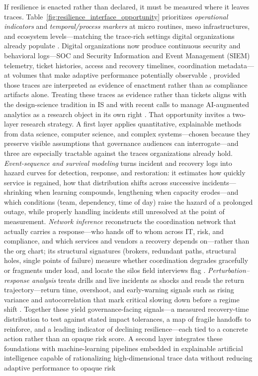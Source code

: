 If resilience is enacted rather than declared, it must be measured where it leaves traces. Table~\ref{fig:resilience_interface_opportunity} prioritizes \emph{operational indicators} and \emph{temporal/process markers} at micro routines, meso infrastructures, and ecosystem levels---matching the trace-rich settings digital organizations already populate \autocite{bruneau2003framework,francis2014metric,kuypers2018designing}. Digital organizations now produce continuous security and behavioral logs---SOC and Security Information and Event Management (SIEM) telemetry, ticket histories, access and recovery timelines, coordination metadata---at volumes that make adaptive performance potentially observable \autocite{howison2011validity,miloslavskaya2016security,kuypers2018designing}, provided those traces are interpreted as evidence of enactment rather than as compliance artifacts alone. Treating these traces as evidence rather than tickets aligns with the design-science tradition in IS \autocite{hevner2004design,gregor2013positioning,baskerville2015genres} and with recent calls to manage AI-augmented analytics as a research object in its own right \autocite{berente2021managing}. That opportunity invites a two-layer research strategy. A first layer applies quantitative, explainable methods from data science, computer science, and complex systems---chosen because they preserve visible assumptions that governance audiences can interrogate---and three are especially tractable against the traces organizations already hold. \emph{Event-sequence and survival modeling} turns incident and recovery logs into hazard curves for detection, response, and restoration: it estimates how quickly service is regained, how that distribution shifts across successive incidents---shrinking when learning compounds, lengthening when capacity erodes---and which conditions (team, dependency, time of day) raise the hazard of a prolonged outage, while properly handling incidents still unresolved at the point of measurement. \emph{Network inference} reconstructs the coordination network that actually carries a response---who hands off to whom across IT, risk, and compliance, and which services and vendors a recovery depends on---rather than the org chart; its structural signatures (brokers, redundant paths, structural holes, single points of failure) measure whether coordination degrades gracefully or fragments under load, and locate the silos field interviews flag \autocite{gao2016universal}. \emph{Perturbation--response analysis} treats drills and live incidents as shocks and reads the return trajectory---return time, overshoot, and early-warning signals such as rising variance and autocorrelation that mark critical slowing down before a regime shift \autocite{dawson2011agentbased,krakovska2023resilience}. Together these yield governance-facing signals---a measured recovery-time distribution to test against stated impact tolerances, a map of fragile handoffs to reinforce, and a leading indicator of declining resilience---each tied to a concrete action rather than an opaque risk score. A second layer integrates these foundations with machine-learning pipelines embedded in explainable artificial intelligence capable of rationalizing high-dimensional trace data without reducing adaptive performance to opaque risk 